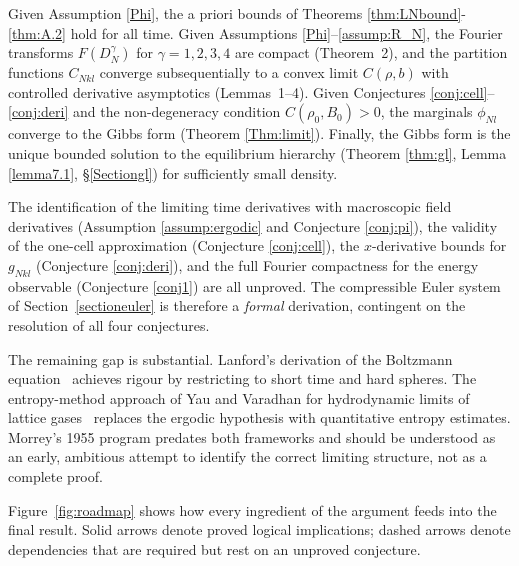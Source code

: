 \documentclass[11pt]{article}
\begin{document}
\begin{description}[leftmargin=0pt, itemsep=4pt,
                    font=\normalfont\itshape]

\item[What is fully proved.]
Given Assumption \ref{Phi}, the a priori bounds of Theorems \ref{thm:LNbound}-\ref{thm:A.2}
hold for all time.
Given Assumptions \ref{Phi}--\ref{assump:R_N}, the Fourier transforms
$F(D_N^\gamma)$ for $\gamma=1,2,3,4$ are compact
(Theorem~2), and the partition functions $C_{Nkl}$
converge subsequentially to a convex limit $C(\rho,b)$
with controlled derivative asymptotics (Lemmas~1--4).
Given Conjectures \ref{conj:cell}--\ref{conj:deri} and the non-degeneracy condition
$C(\rho_0,B_0)>0$, the marginals $\phi_{Nl}$ converge
to the Gibbs form (Theorem \ref{Thm:limit}).
Finally, the Gibbs form is the unique bounded solution
to the equilibrium hierarchy (Theorem \ref{thm:gl}, Lemma \ref{lemma7.1}, \S\ref{Sectiongl})
for sufficiently small density.

\item[What requires open conjectures.]
The identification of the limiting time derivatives with
macroscopic field derivatives (Assumption \ref{assump:ergodic} and Conjecture \ref{conj:pi}),
the validity of the one-cell approximation (Conjecture \ref{conj:cell}),
the $x$-derivative bounds for $g_{Nkl}$ (Conjecture \ref{conj:deri}),
and the full Fourier compactness for the energy observable
(Conjecture \ref{conj1}) are all unproved.
The compressible Euler system of Section~\ref{sectioneuler}
is therefore a \emph{formal} derivation, contingent on the
resolution of all four conjectures.

\item[Comparison with modern results.]
The remaining gap is substantial.
Lanford's derivation of the Boltzmann equation~\cite{Lanford1975}
achieves rigour by restricting to short time and hard spheres.
The entropy-method approach of Yau and Varadhan for
hydrodynamic limits of lattice gases~\cite{DeMasiEtAl1984}
replaces the ergodic hypothesis with quantitative entropy
estimates. Morrey's 1955 program predates both frameworks
and should be understood as an early, ambitious attempt
to identify the correct limiting structure, not as
a complete proof.

\end{description}

Figure~\ref{fig:roadmap} shows how every ingredient of the
argument feeds into the final result.
Solid arrows denote proved logical implications;
dashed arrows denote dependencies that are required but
rest on an unproved conjecture.
\end{document}
